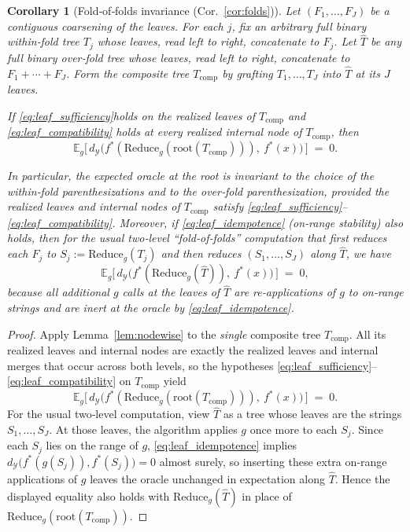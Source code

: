 \documentclass[11pt]{article}
\newtheorem{corollary}{Corollary}
\newcommand{\Y}{\mathcal{Y}}               %
\newcommand{\fstar}{f^*}               %
\newcommand{\E}{\mathbb{E}}
\newcommand{\metric}{d_{\Y}}
\newcommand{\reduce}{\text{Reduce}}
\newcommand{\reduceg}{\reduce_g}
\newcommand{\Eg}{\E_g}     %
\begin{document}
\begin{corollary}[Fold‑of‑folds invariance (Cor.~\ref{cor:folds})]\label{cor:folds2}
Let $(F_1,\ldots,F_J)$ be a contiguous coarsening of the leaves. For each $j$, fix an arbitrary full
binary within‑fold tree $T_j$ whose leaves, read left to right, concatenate to $F_j$. Let $\widehat T$ be any full
binary over‑fold tree whose leaves, read left to right, concatenate to $F_1+\cdots+F_J$. Form the
\emph{composite tree} $T_{\mathrm{comp}}$ by grafting $T_1,\ldots,T_J$ into $\widehat T$ at its $J$ leaves.

If \eqref{eq:leaf_sufficiency}holds on the realized leaves of $T_{\mathrm{comp}}$ and \eqref{eq:leaf_compatibility} holds at every realized internal node of $T_{\mathrm{comp}}$,
then
\[
\Eg\!\Big[\,\metric\!\big(\fstar(\reduceg(\mathrm{root}(T_{\mathrm{comp}}))),\ \fstar(x)\big)\,\Big]\;=\;0.
\]

In particular, the expected oracle at the root is invariant to the choice of the within‑fold parenthesizations and to the over‑fold parenthesization, provided the realized leaves and internal nodes of $T_{\mathrm{comp}}$ satisfy \eqref{eq:leaf_sufficiency}–\eqref{eq:leaf_compatibility}. Moreover, if \eqref{eq:leaf_idempotence} (on‑range stability) also holds, then for the usual two‑level “fold‑of‑folds” computation that first reduces each $F_j$ to $S_j:=\reduceg(T_j)$ and then reduces $(S_1,\ldots,S_J)$ along $\widehat T$, we have
\[
\Eg\!\Big[\,\metric\!\big(\fstar(\reduceg(\widehat T)),\ \fstar(x)\big)\,\Big]\;=\;0,
\]
because all additional $g$ calls at the leaves of $\widehat T$ are re‑applications of $g$ to on‑range strings and are inert at the oracle by \eqref{eq:leaf_idempotence}.
\end{corollary}

\begin{proof}
Apply Lemma~\ref{lem:nodewise} to the \emph{single} composite tree $T_{\mathrm{comp}}$. All its realized leaves and internal nodes are exactly the realized leaves and internal merges that occur across both levels, so the hypotheses \eqref{eq:leaf_sufficiency}–\eqref{eq:leaf_compatibility} on $T_{\mathrm{comp}}$ yield
\[
\Eg\!\Big[\,\metric\!\big(\fstar(\reduceg(\mathrm{root}(T_{\mathrm{comp}}))),\ \fstar(x)\big)\,\Big]\;=\;0.
\]
For the usual two‑level computation, view $\widehat T$ as a tree whose leaves are the strings $S_1,\ldots,S_J$. At those leaves, the algorithm applies $g$ once more to each $S_j$. Since each $S_j$ lies on the range of $g$, \eqref{eq:leaf_idempotence} implies $\metric\!\big(\fstar(g(S_j)),\fstar(S_j)\big)=0$ almost surely, so inserting these extra on‑range applications of $g$ leaves the oracle unchanged in expectation along $\widehat T$. Hence the displayed equality also holds with $\reduceg(\widehat T)$ in place of $\reduceg(\mathrm{root}(T_{\mathrm{comp}}))$.
\end{proof}
\end{document}

